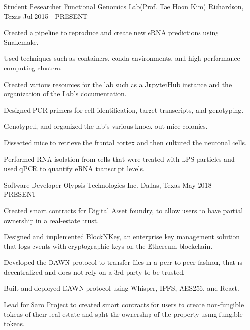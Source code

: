 

\begin{cventries}

	\cventry
	{Student Researcher} %
	{Functional Genomics Lab(Prof. Tae Hoon Kim)} %
	{Richardson, Texas} %
	{Jul 2015 - PRESENT} %
	{
		\begin{cvitems} %
			\item {Created a pipeline to reproduce and create new eRNA
					predictions using Snakemake.}
			\item {Used techniques such as containers, conda environments, and
					high-performance computing clusters.}
			\item {Created various resources for the lab such as a JupyterHub
					instance and the organization of the Lab's documentation.}
			\item {Designed PCR primers for cell identification, target transcripts, and genotyping.}
			\item {Genotyped, and organized the lab's various knock-out mice colonies.}
			\item {Dissected mice to retrieve the frontal cortex and then cultured the neuronal cells.}
			\item {Performed RNA isolation from cells that were treated with LPS-particles and used qPCR to quantify eRNA transcript levels.}
		\end{cvitems}
	}

	\cventry
	{Software Developer} %
	{Olypsis Technologies Inc.} %
	{Dallas, Texas} %
	{May 2018 - PRESENT} %
	{
		\begin{cvitems} %
			\item {Created smart contracts for Digital Asset foundry, to allow
					users to have partial ownership in a real-estate trust.}
			\item {Designed and implemented BlockNKey, an enterprise key management solution
					that logs events with cryptographic keys on the Ethereum blockchain.}
			\item {Developed the DAWN protocol to transfer files in a peer to peer fashion, that is decentralized and does not rely on a 3rd party to be trusted.}
			\item {Built and deployed DAWN protocol using Whisper, IPFS, AES256, and React.}
			\item {Lead for Saro Project to created smart contracts for users to create non-fungible tokens of their real estate and split the ownership of the property using fungible tokens.}
		\end{cvitems}
	}


\end{cventries}

